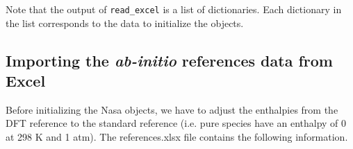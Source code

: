 \documentclass[11pt]{article}
\begin{document}
    Note that the output of \texttt{read\_excel} is a list of dictionaries.
Each dictionary in the list corresponds to the data to initialize the
objects.

    \subsection{\texorpdfstring{Importing the \emph{ab-initio} references
data from
Excel}{Importing the ab-initio references data from Excel}}\label{importing-the-ab-initio-references-data-from-excel}

Before initializing the Nasa objects, we have to adjust the enthalpies
from the DFT reference to the standard reference (i.e. pure species have
an enthalpy of 0 at 298 K and 1 atm). The references.xlsx file contains
the following information.
\end{document}
